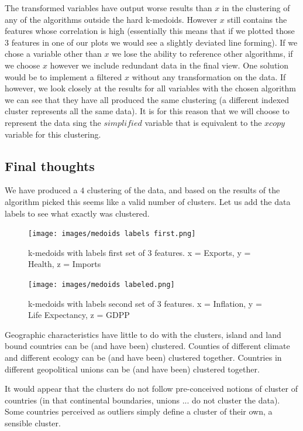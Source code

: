 \documentclass[12pt, a4paper]{article}
\begin{document}
The transformed variables have output worse results than $x$ in the clustering of any of the algorithms outside the hard k-medoids. However $x$ still contains the features whose correlation is high (essentially this means that if we plotted those 3 features in one of our plots we would see a slightly deviated line forming). If we chose a variable other than $x$ we lose the ability to reference other algorithms, if we choose $x$ however we include redundant data in the final view. One solution would be to implement a filtered $x$ without any transformation on the data. If however, we look closely at the results for all variables with the chosen algorithm we can see that they have all produced the same clustering (a different indexed cluster represents all the same data). It is for this reason that we will choose to represent the data sing the $simplified$ variable that is equivalent to the $xcopy$ variable for this clustering.

\subsection{Final thoughts}

We have produced a $4$ clustering of the data, and based on the results of the algorithm picked this seems like a valid number of clusters. Let us add the data labels to see what exactly was clustered. 

\begin{figure}[H]
    \centering
    \texttt{[image: images/medoids labels first.png]}
    \caption{k-medoids with labels first set of 3 features. x = Exports, y = Health, z = Imports}
    \label{fig:ncopy-optimal}
\end{figure}

\begin{figure}[H]
    \centering
    \texttt{[image: images/medoids labeled.png]}
    \caption{k-medoids with labels second set of 3 features. x = Inflation, y = Life Expectancy, z = GDPP}
    \label{fig:ncopy-optimal}
\end{figure}

Geographic characteristics have little to do with the clusters, island and land bound countries can be (and have been) clustered. Counties of different climate and different ecology can be (and have been) clustered together. Countries in different geopolitical unions can be (and have been) clustered together.
\newline

It would appear that the clusters do not follow pre-conceived notions of cluster of countries (in that continental boundaries, unions ... do not cluster the data). Some countries perceived as outliers simply define a cluster of their own, a sensible cluster.
\end{document}
